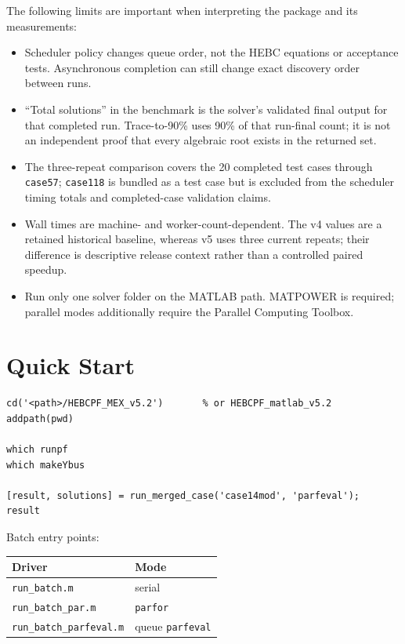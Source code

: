 \documentclass[11pt,a4paper]{article}
\newcommand{\code}[1]{\texttt{#1}}
\begin{document}
The following limits are important when interpreting the package and its measurements:

\begin{itemize}[leftmargin=1.4em]
  \item Scheduler policy changes queue order, not the HEBC equations or acceptance tests.
        Asynchronous completion can still change exact discovery order between runs.
  \item ``Total solutions'' in the benchmark is the solver's validated final output for
        that completed run. Trace-to-90\% uses 90\% of that run-final count; it is not an
        independent proof that every algebraic root exists in the returned set.
  \item The three-repeat comparison covers the 20 completed test cases through
        \code{case57}; \code{case118} is bundled as a test case but is excluded from the
        scheduler timing totals and completed-case validation claims.
  \item Wall times are machine- and worker-count-dependent. The v4 values are a retained
        historical baseline, whereas v5 uses three current repeats; their difference is
        descriptive release context rather than a controlled paired speedup.
  \item Run only one solver folder on the MATLAB path. MATPOWER is required; parallel
        modes additionally require the Parallel Computing Toolbox.
\end{itemize}

\section{Quick Start}

\begin{lstlisting}[style=mat]
cd('<path>/HEBCPF_MEX_v5.2')       % or HEBCPF_matlab_v5.2
addpath(pwd)

which runpf
which makeYbus

[result, solutions] = run_merged_case('case14mod', 'parfeval');
result
\end{lstlisting}

Batch entry points:

\begin{center}
\begin{tabular}{@{}ll@{}}
\toprule
\textbf{Driver} & \textbf{Mode}\\
\midrule
\code{run_batch.m} & serial\\
\code{run_batch_par.m} & \code{parfor}\\
\code{run_batch_parfeval.m} & queue \code{parfeval}\\
\bottomrule
\end{tabular}
\end{center}
\end{document}
